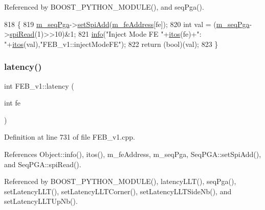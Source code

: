 Referenced by B\+O\+O\+S\+T\+\_\+\+P\+Y\+T\+H\+O\+N\+\_\+\+M\+O\+D\+U\+L\+E(), and seq\+Pga().


\begin{DoxyCode}
818                                  \{
819   \hyperlink{classFEB__v1_a6c7804ac86796f233a8393043adf2e77}{m\_seqPga}->\hyperlink{classSeqPGA_ac998ce3a6d9b5f2e88cc8393f8c1df53}{setSpiAdd}(\hyperlink{classFEB__v1_a4e1945c2d5b434125f375e9d0fc6d99f}{m\_feAddress}[fe]);
820   \textcolor{keywordtype}{int} val = (\hyperlink{classFEB__v1_a6c7804ac86796f233a8393043adf2e77}{m\_seqPga}->\hyperlink{classSeqPGA_ab3d0e5e5d4014bc7a92588a76b8713d4}{spiRead}(1)>>10)&1;
821   \hyperlink{classObject_a644fd329ea4cb85f54fa6846484b84a8}{info}(\textcolor{stringliteral}{"Inject Mode FE "}+\hyperlink{Tools_8h_af330027dbdafb9a30768b3613c553e60}{itos}(fe)+\textcolor{stringliteral}{": "}+\hyperlink{Tools_8h_af330027dbdafb9a30768b3613c553e60}{itos}(val),\textcolor{stringliteral}{"FEB\_v1::injectModeFE"});
822   \textcolor{keywordflow}{return} (\textcolor{keywordtype}{bool})(val);
823 \}
\end{DoxyCode}
\mbox{\label{classFEB__v1_a68050d232efd8d6568910b09a2c18f62}} 
\subsubsection{\texorpdfstring{latency()}{latency()}}
{\footnotesize\ttfamily int F\+E\+B\+\_\+v1\+::latency (\begin{DoxyParamCaption}\item[{int}]{fe }\end{DoxyParamCaption})}



Definition at line 731 of file F\+E\+B\+\_\+v1.\+cpp.



References Object\+::info(), itos(), m\+\_\+fe\+Address, m\+\_\+seq\+Pga, Seq\+P\+G\+A\+::set\+Spi\+Add(), and Seq\+P\+G\+A\+::spi\+Read().



Referenced by B\+O\+O\+S\+T\+\_\+\+P\+Y\+T\+H\+O\+N\+\_\+\+M\+O\+D\+U\+L\+E(), latency\+L\+L\+T(), seq\+Pga(), set\+Latency\+L\+L\+T(), set\+Latency\+L\+L\+T\+Corner(), set\+Latency\+L\+L\+T\+Side\+Nb(), and set\+Latency\+L\+L\+T\+Up\+Nb().


